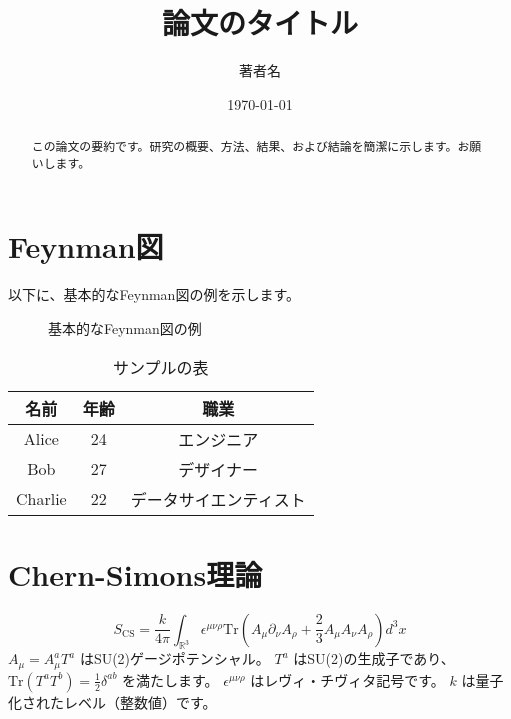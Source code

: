 \documentclass[a4paper,12pt]{article}
\title{論文のタイトル}
\author{著者名}
\date{\today}
\begin{document}
\maketitle

\begin{abstract}
この論文の要約です。研究の概要、方法、結果、および結論を簡潔に示します。お願いします。
\end{abstract}

\section{Feynman図}
以下に、基本的なFeynman図の例を示します。

\begin{figure}[h]
    \centering
    \caption{基本的なFeynman図の例}
    \label{fig:feynman}
\end{figure}



\begin{table}[h]
  \centering
  \begin{tabular}{|c|c|c|}
      \hline
      名前 & 年齢 & 職業 \\
      \hline
      Alice & 24 & エンジニア \\
      \hline
      Bob & 27 & デザイナー \\
      \hline
      Charlie & 22 & データサイエンティスト \\
      \hline
  \end{tabular}
  \caption{サンプルの表}
  \label{tab:sample}
\end{table}


\section{Chern-Simons理論}
\begin{equation}
    S_{\mathrm{CS}} = \frac{k}{4\pi} \int_{\mathbb{R}^3} \epsilon^{\mu\nu\rho} \text{Tr} \left( A_\mu \partial_\nu A_\rho + \frac{2}{3} A_\mu A_\nu A_\rho \right) d^3x
\end{equation}
$ A_\mu = A_\mu^a T^a $ はSU(2)ゲージポテンシャル。
$ T^a $ はSU(2)の生成子であり、$ \text{Tr}(T^a T^b) = \frac{1}{2}\delta^{ab} $ を満たします。
$ \epsilon^{\mu\nu\rho} $ はレヴィ・チヴィタ記号です。
$ k $ は量子化されたレベル（整数値）です。
\end{document}
